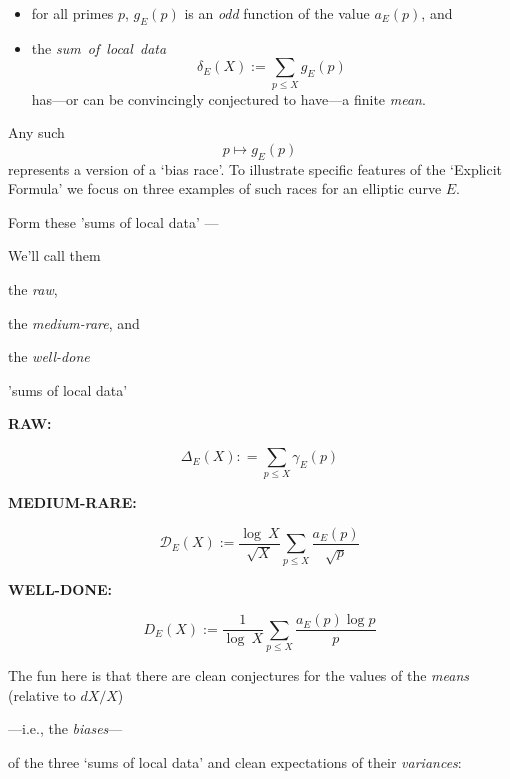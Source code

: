 \documentclass[12pt]{beamer}
\theoremstyle{definition}
\begin{document}
\begin{frame}\vskip20pt
{\Large \vskip40pt
\begin{itemize} \item for all primes $p$, $g_E(p)$ is an {\it odd} function of the value  $a_E(p)$, and \vskip20pt \item the {\it sum\ of\ local\ data}  $$\delta_E(X):=\sum_{p\le X}g_E(p)$$ has---or can be convincingly conjectured to have---a finite  {\it mean}.\end{itemize}}\end{frame}
\begin{frame}\vskip20pt
{\Large \vskip40pt
Any such  $$p \mapsto  g_E(p)$$ represents a version of a `bias race'.
\vskip20pt
To illustrate specific features of the `Explicit Formula' we focus on three examples of such races for an elliptic curve $E$. }\end{frame}
\begin{frame}\vskip20pt
{\Large  \vskip20pt  Form  these 'sums of local data' ---\vskip20pt

We'll call them \vskip10pt  \centerline{the {\it raw},}\vskip10pt  \centerline{the {\it medium-rare}, and }\vskip10pt \centerline{the {\it well-done}}\vskip20pt 'sums of local data' }\end{frame}
\begin{frame}\vskip20pt
{\Large  \vskip20pt
 \centerline{\bf RAW:} \vskip20pt  $$\Delta_E(X): =\sum_{p\le X}\gamma_E(p)$$} \end{frame}
\begin{frame}\vskip20pt
{\Large  \vskip20pt
 \centerline{\bf MEDIUM-RARE:}  \vskip20pt$${\mathcal D}_E(X):= {\frac{\log\ X}{\sqrt X}}\sum_{p \le X}{\frac{a_E(p)}{\sqrt p}}$$} \end{frame}
\begin{frame}\vskip20pt
{\Large  \vskip20pt
  \centerline{\bf WELL-DONE:} \vskip20pt$${D}_E(X):= {\frac{1}{\log\ X}}\sum_{p \le X}{\frac{a_E(p)\log p}{ p}}$$} \end{frame}

 \begin{frame}\vskip20pt
{\Large  \vskip20pt

   The fun here is that there are clean conjectures for\vskip20pt the values of the {\it means} (relative to $dX/X$)\vskip20pt \centerline{---i.e., the {\it biases}---}\vskip20pt of the three `sums of local data' \vskip20pt and clean expectations of their {\it variances}:} \end{frame}
\end{document}
